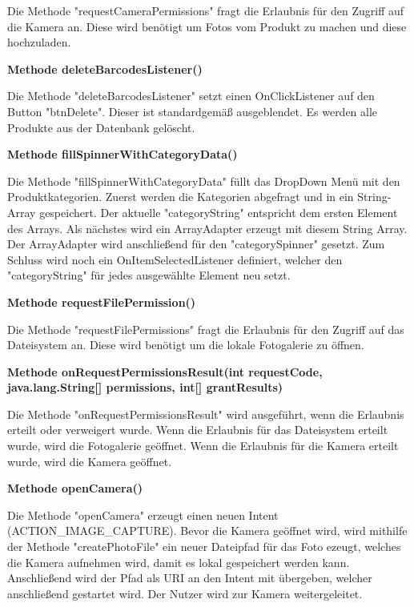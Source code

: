 \documentclass{scrartcl}
\begin{document}
\noindent Die Methode "requestCameraPermissions" fragt die Erlaubnis für den Zugriff auf die Kamera an. Diese wird benötigt um Fotos vom Produkt zu machen und diese hochzuladen. \newline

\noindent\textbf{Methode deleteBarcodesListener()} 

\noindent Die Methode "deleteBarcodesListener" setzt einen OnClickListener auf den Button "btnDelete". Dieser ist standardgemäß ausgeblendet. Es werden alle Produkte aus der Datenbank gelöscht. \newline 

\noindent\textbf{Methode fillSpinnerWithCategoryData()} 

\noindent Die Methode "fillSpinnerWithCategoryData" füllt das DropDown Menü mit den Produktkategorien. Zuerst werden die Kategorien abgefragt und in ein String-Array gespeichert. Der aktuelle "categoryString" entspricht dem ersten Element des Arrays. Als nächstes wird ein ArrayAdapter erzeugt mit diesem String Array. Der ArrayAdapter wird anschließend für den "categorySpinner" gesetzt. Zum Schluss wird noch ein OnItemSelectedListener definiert, welcher den "categoryString" für jedes ausgewählte Element neu setzt. \newline

\noindent\textbf{Methode requestFilePermission()} 

\noindent Die Methode "requestFilePermissions" fragt die Erlaubnis für den Zugriff auf das Dateisystem an. Diese wird benötigt um die lokale Fotogalerie zu öffnen. \newline

\noindent\textbf{Methode onRequestPermissionsResult(int requestCode, \newline           java.lang.String[] permissions, int[] grantResults)} 

\noindent Die Methode "onRequestPermissionsResult" wird ausgeführt, wenn die Erlaubnis erteilt oder verweigert wurde. Wenn die Erlaubnis für das Dateisystem erteilt wurde, wird die Fotogalerie geöffnet. Wenn die Erlaubnis für die Kamera erteilt wurde, wird die Kamera geöffnet. \newline 

\noindent\textbf{Methode openCamera()} 

\noindent Die Methode "openCamera" erzeugt einen neuen Intent (ACTION\_IMAGE\_CAPTURE). Bevor die Kamera geöffnet wird, wird mithilfe der Methode "createPhotoFile" ein neuer Dateipfad für das Foto ezeugt, welches die Kamera aufnehmen wird, damit es lokal gespeichert werden kann. Anschließend wird der Pfad als URI an den Intent mit übergeben, welcher anschließend gestartet wird. Der Nutzer wird zur Kamera weitergeleitet. \newline
\end{document}

